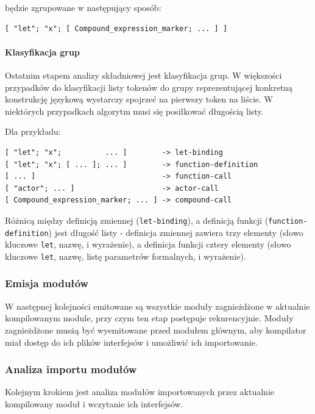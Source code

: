 \documentclass[11pt,oneside,a4paper,titlepage,onecolumn]{article}
\begin{document}
będzie zgrupowane w następujący sposób:

\begin{lstlisting}
[ "let"; "x"; [ Compound_expression_marker; ... ] ]
\end{lstlisting}

\paragraph{Klasyfikacja grup}

Ostatnim etapem analizy składniowej jest klasyfikacja grup. W większości przypadków do klasyfikacji listy
tokenów do grupy reprezentującej konkretną konstrukcję językową wystarczy spojrzeć na pierwszy token na
liście. W niektórych przypadkach algorytm musi się posiłkować długością listy.

Dla przykładu:

\begin{lstlisting}
[ "let"; "x";          ... ]        -> let-binding
[ "let"; "x"; [ ... ]; ... ]        -> function-definition
[ ... ]                             -> function-call
[ "actor"; ... ]                    -> actor-call
[ Compound_expression_marker; ... ] -> compound-call
\end{lstlisting}

Różnicą między definicją zmiennej (\texttt{let-binding}), a definicją funkcji (\texttt{function-definition})
jest długość listy - definicja zmiennej zawiera trzy elementy (słowo kluczowe \texttt{let}, nazwę, i
wyrażenie), a definicja funkcji cztery elementy (słowo kluczowe \texttt{let}, nazwę, listę parametrów
formalnych, i wyrażenie).

\subsubsection{Emisja modułów}

W następnej kolejności emitowane są wszystkie moduły zagnieżdżone w aktualnie kompilowanym module, przy czym
ten etap postępuje rekurencyjnie. Moduły zagnieżdżone musżą być wyemitowane przed modułem głównym, aby
kompilator miał dostęp do ich plików interfejsów i umożliwić ich importowanie.

\subsubsection{Analiza importu modułów}

Kolejnym krokiem jest analiza modułów importowanych przez aktualnie kompilowany moduł i wczytanie ich
interfejsów.
\end{document}
